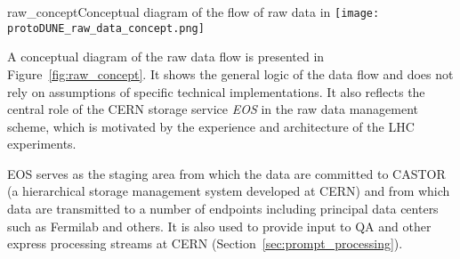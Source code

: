\begin{cdrfigure}{raw_concept}{Conceptual diagram of the flow of raw data in \pdsp} 
\texttt{[image: protoDUNE\_raw\_data\_concept.png]}
\end{cdrfigure}



A conceptual diagram of the raw data flow is presented in Figure~\ref{fig:raw_concept}. It shows the general logic
of the data flow and does not rely on assumptions of specific technical implementations. 
It also reflects the central role of the CERN storage service \textit{EOS} in the raw data management scheme, which is motivated by the experience
and architecture of the LHC experiments.


EOS serves as the staging area from which the data are committed to CASTOR (a hierarchical storage management system developed at CERN)
and from which data are transmitted to a number of endpoints including principal data centers such as Fermilab and others.
It is also used to provide input to QA and other express processing streams at CERN (Section~\ref{sec:prompt_processing}).


